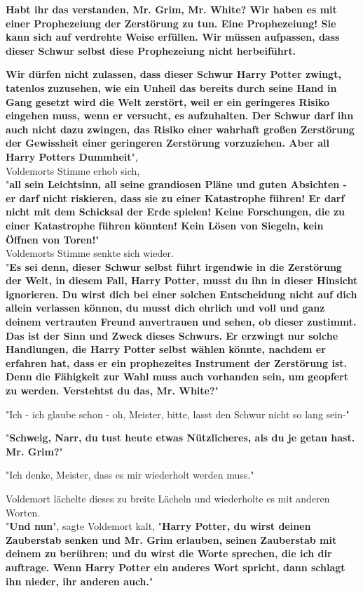 {\textbf{Habt ihr das verstanden, Mr. Grim, Mr. White? Wir haben es mit einer Prophezeiung der Zerstörung zu tun. Eine Prophezeiung! Sie kann sich auf verdrehte Weise erfüllen. Wir müssen aufpassen, dass dieser Schwur selbst diese Prophezeiung nicht herbeiführt.}

\textbf{Wir dürfen nicht zulassen, dass dieser Schwur Harry Potter zwingt, tatenlos} \textbf{zuzusehen, wie ein Unheil das bereits durch seine Hand in Gang gesetzt wird die Welt zerstört, weil er ein geringeres Risiko eingehen muss, wenn er versucht, es aufzuhalten. Der Schwur darf ihn auch nicht dazu zwingen, das Risiko einer wahrhaft großen Zerstörung der Gewissheit einer geringeren Zerstörung vorzuziehen. Aber all Harry Potters Dummheit}",\\ Voldemorts Stimme erhob sich,\\ "\textbf{all sein Leichtsinn, all seine grandiosen Pläne und guten Absichten - er darf nicht riskieren, dass sie zu einer Katastrophe führen! Er darf nicht mit dem Schicksal der Erde spielen! Keine Forschungen, die zu einer Katastrophe führen könnten! Kein Lösen von Siegeln, kein Öffnen von Toren!}"\\ Voldemorts Stimme senkte sich wieder.\\ "\textbf{Es sei denn, dieser Schwur selbst führt irgendwie in die Zerstörung der Welt, in diesem Fall, Harry Potter, musst du ihn in dieser Hinsicht ignorieren. Du wirst dich bei einer solchen Entscheidung nicht auf dich allein verlassen können, du musst dich ehrlich und voll und ganz deinem vertrauten Freund anvertrauen und sehen, ob dieser zustimmt.}\\ \textbf{\hfill\break Das ist der Sinn und Zweck dieses Schwurs. Er erzwingt nur solche Handlungen, die Harry Potter selbst wählen könnte, nachdem er erfahren hat, dass er ein prophezeites Instrument der Zerstörung ist. Denn die Fähigkeit zur Wahl muss auch vorhanden sein, um geopfert zu werden. Verstehtst du das, Mr. White?}"

"Ich - ich glaube schon - oh, Meister, bitte, lasst den Schwur nicht so lang sein-"

"\textbf{Schweig, Narr, du tust heute etwas Nützlicheres, als du je getan hast. Mr. Grim?}"

"Ich denke, Meister, dass es mir wiederholt werden muss."

Voldemort lächelte dieses zu breite Lächeln und wiederholte es mit anderen Worten.\\ "\textbf{Und nun}", sagte Voldemort kalt, "\textbf{Harry Potter, du wirst deinen Zauberstab senken und Mr. Grim erlauben, seinen Zauberstab mit deinem zu berühren; und du wirst die Worte sprechen, die ich dir auftrage. Wenn Harry Potter ein anderes Wort spricht, dann schlagt ihn nieder, ihr anderen auch.}"

}
